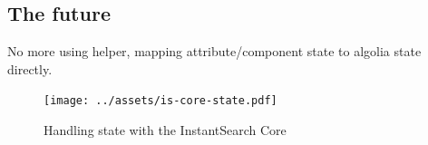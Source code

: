 \subsection{The future} %
\label{sub:the_future}

No more using helper, mapping attribute/component state to algolia state directly. %

\begin{figure}[H]
\label{figure:is-core-state}
  \centering
  \texttt{[image: ../assets/is-core-state.pdf]}
  \caption{Handling state with the InstantSearch Core}
\end{figure}


